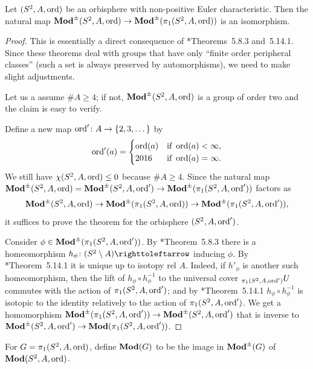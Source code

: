 \documentclass{amsart}
\begin{document}
\begin{thm}
  \label{thm:dehn-nielsen-baer-zieschang}
  Let $(S^2,A,\operatorname{ord})$ be an orbisphere with non-positive Euler
  characteristic. Then the natural map
  $\mathbf{\relax Mod}^{\pm}(S^2,A,\operatorname{ord})\to \mathbf{\relax Mod}^{\pm}(\pi_1(S^2,A,\operatorname{ord}))$ is an
  isomorphism.
\end{thm}
\begin{proof} 
  This is essentially a direct consequence of
  \cite{zieschang-vogt-coldewey:spdg}*{Theorems~5.8.3
    and~5.14.1}. Since these theorems deal with groups that have only
  ``finite order peripheral classes'' (such a set is always preserved
  by automorphisms), we need to make slight adjustments.

  Let us a assume $\#A\ge 4$; if not, $\mathbf{\relax Mod}^{\pm }(S^2,A,\operatorname{ord})$ is a
  group of order two and the claim is easy to verify.

  Define a new map $\operatorname{ord}'\colon A\to\{2,3,\dots\}$ by
  \[\operatorname{ord}'(a)=\begin{cases} \operatorname{ord}(a)&\text{if } \operatorname{ord}(a)<\infty,\\
      2016 & \text{if } \operatorname{ord}(a)=\infty.
    \end{cases}
\]
We still have $\chi(S^2,A,\operatorname{ord})\le 0$ because $\#A\ge 4$. Since the
natural map
$\mathbf{\relax Mod}^{\pm}(S^2,A,\operatorname{ord}) =\mathbf{\relax Mod}^{\pm}(S^2,A,\operatorname{ord}')\to
\mathbf{\relax Mod}^{\pm}(\pi_1(S^2,A,\operatorname{ord}'))$ factors as
\[\mathbf{\relax Mod}^{\pm}(S^2,A,\operatorname{ord})\to \mathbf{\relax Mod}^{\pm}(\pi_1(S^2,A,\operatorname{ord}))\to
  \mathbf{\relax Mod}^{\pm}(\pi_1(S^2,A,\operatorname{ord}')),
\]
it suffices to prove the theorem for the orbisphere $(S^2,A,\operatorname{ord}')$.

Consider $\phi\in \mathbf{\relax Mod}^{\pm}(\pi_1(S^2,A,\operatorname{ord}'))$. By
\cite{zieschang-vogt-coldewey:spdg}*{Theorem~5.8.3} there is a
homeomorphism $h_{\phi}\colon (S^2\setminus A)\selfmap$ inducing
$\phi$. By \cite{zieschang-vogt-coldewey:spdg}*{Theorem~5.14.1} it is
unique up to isotopy rel $A$. Indeed, if $h'_{\phi}$ is another such
homeomorphism, then the lift of $h_{\phi}\circ h^{-1}_{\phi}$ to the
universal cover $\subscript{\pi_1(S^2,A,\ord')}U$ commutes with the action of
$\pi_1(S^2,A,\operatorname{ord}')$; and by
\cite{zieschang-vogt-coldewey:spdg}*{Theorem~5.14.1}
$h_{\phi}\circ h^{-1}_{\phi}$ is isotopic to the identity relatively
to the action of $\pi_1(S^2,A,\operatorname{ord}')$. We get a homomorphism
$\mathbf{\relax Mod}^{\pm}(\pi_1(S^2,A,\operatorname{ord}'))\to \mathbf{\relax Mod}^{\pm}(S^2,A,\operatorname{ord}')$ that is
inverse to $\mathbf{\relax Mod}^{\pm}(S^2,A, \operatorname{ord}') \to \mathbf{\relax Mod}(\pi_1(S^2,A,\operatorname{ord}'))$.
\end{proof}

For $G=\pi_1(S^2,A,\operatorname{ord})$, define $\mathbf{\relax Mod}(G)$ to be the image in
$\mathbf{\relax Mod}^{\pm}(G)$ of $\mathbf{\relax Mod}(S^2,A,\operatorname{ord})$.
\end{document}
